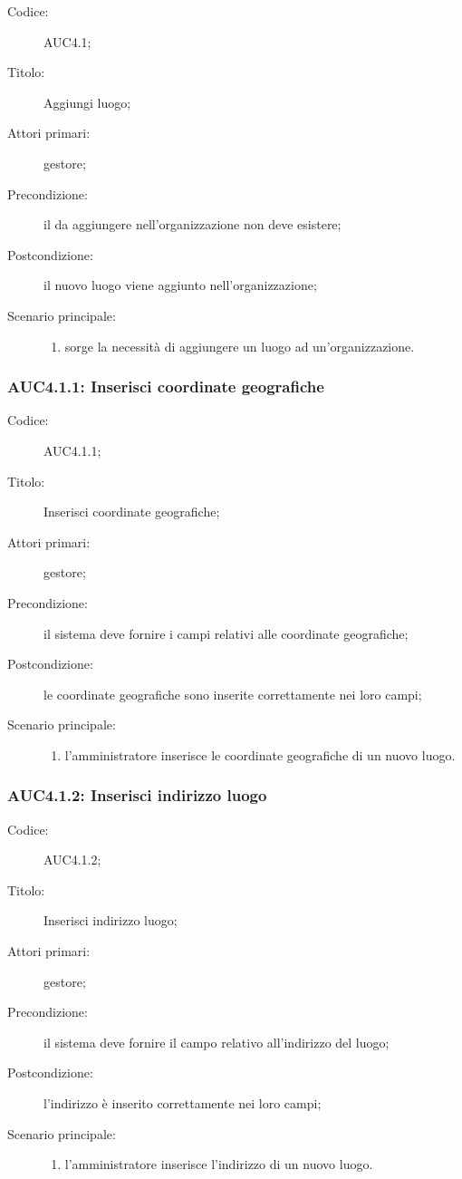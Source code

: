 \begin{description}
  \item[Codice:] AUC4.1;
  \item[Titolo:] Aggiungi luogo;
  \item[Attori primari:] gestore;
  \item[Precondizione:] il  da aggiungere nell'organizzazione non deve esistere;
  \item[Postcondizione:] il nuovo luogo viene aggiunto nell'organizzazione;
  \item[Scenario principale:]
  \begin{enumerate}
    \item sorge la necessità di aggiungere un luogo ad un'organizzazione.
  \end{enumerate}
\end{description}

\subsubsection{AUC4.1.1: Inserisci coordinate geografiche}%
\label{subs:AUC4.1.1}
\begin{description}
  \item[Codice:] AUC4.1.1;
  \item[Titolo:] Inserisci coordinate geografiche;
  \item[Attori primari:] gestore;
  \item[Precondizione:] il sistema deve fornire i campi relativi alle coordinate geografiche;
  \item[Postcondizione:] le coordinate geografiche sono inserite correttamente nei loro campi;
  \item[Scenario principale:]
  \begin{enumerate}
    \item l'amministratore inserisce le coordinate geografiche di un nuovo luogo.
  \end{enumerate}
\end{description}

\subsubsection{AUC4.1.2: Inserisci indirizzo luogo}%
\label{subs:AUC4.1.2}
\begin{description}
  \item[Codice:] AUC4.1.2;
  \item[Titolo:] Inserisci indirizzo luogo;
  \item[Attori primari:] gestore;
  \item[Precondizione:] il sistema deve fornire il campo relativo all'indirizzo del luogo;
  \item[Postcondizione:] l'indirizzo è inserito correttamente nei loro campi;
  \item[Scenario principale:]
  \begin{enumerate}
    \item l'amministratore inserisce l'indirizzo di un nuovo luogo.
  \end{enumerate}
\end{description}

